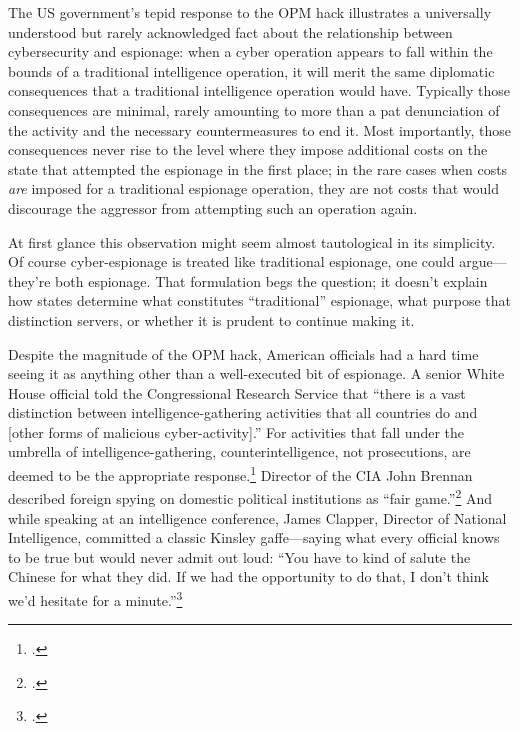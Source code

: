 \documentclass[14pt]{extarticle}
\begin{document}
The US government's tepid response to the OPM hack illustrates a universally understood but rarely acknowledged fact about the relationship between cybersecurity and espionage: when a cyber operation appears to fall within the bounds of a traditional intelligence operation, it will merit the same diplomatic consequences that a traditional intelligence operation would have. Typically those consequences are minimal, rarely amounting to more than a pat denunciation of the activity and the necessary countermeasures to end it. Most importantly, those consequences never rise to the level where they impose additional costs on the state that attempted the espionage in the first place; in the rare cases when costs \emph{are} imposed for a traditional espionage operation, they are not costs that would discourage the aggressor from attempting such an operation again.

At first glance this observation might seem almost tautological in its simplicity. Of course cyber-espionage is treated like traditional espionage, one could argue---they're both espionage. That formulation begs the question;  it doesn't explain how states determine what constitutes \enquote{traditional} espionage, what purpose that distinction servers, or whether it is prudent to continue making it.

Despite the magnitude of the OPM hack, American officials had a hard time seeing it as anything other than a well-executed bit of espionage. A senior White House official told the Congressional Research Service that \enquote{there is a vast distinction between intelligence-gathering activities that all countries do and [other forms of malicious cyber-activity].} For activities that fall under the umbrella of intelligence-gathering, counterintelligence, not prosecutions, are deemed to be the appropriate response.\footcite[In the context of the quote, the White House official is distinguishing between traditional espionage and economic espionage, the latter of which is the state-sponsored theft of trade secrets from foreign private companies in order to gain a competitive advantage in international markets.]{finklea_cyber_2015} Director of the CIA John Brennan described foreign spying on domestic political institutions as \enquote{fair game.}\footcite{sanger_u.s._2016} And while speaking at an intelligence conference, James Clapper, Director of National Intelligence, committed a classic Kinsley gaffe—saying what every official knows to be true but would never admit out loud: \enquote{You have to kind of salute the Chinese for what they did. If we had the opportunity to do that, I don’t think we’d hesitate for a minute.}\footcite{pepitone_clapper_2015}
\end{document}
